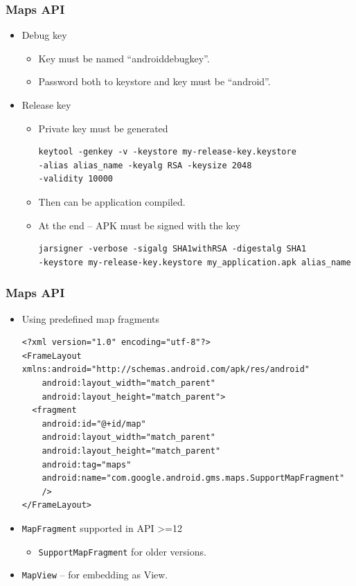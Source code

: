 \documentclass[10pt,xcolor=pdflatex]{beamer}
\begin{document}
\begin{frame}[fragile]\frametitle{Maps API}
\begin{itemize}
	\item Debug key
	  \begin{itemize}
		\item Key must be named “androiddebugkey”.
		\item Password both to keystore and key must be “android”.
	  \end{itemize}
    \item Release key
      \begin{itemize}
    	\item Private key must be generated
         \lstset{language=XML, basicstyle=\footnotesize\ttfamily}
          \begin{lstlisting}
keytool -genkey -v -keystore my-release-key.keystore
-alias alias_name -keyalg RSA -keysize 2048 
-validity 10000
          \end{lstlisting}   
    	\item Then can be application compiled.
        \item At the end -- APK must be signed with the key
         \lstset{language=XML, basicstyle=\footnotesize\ttfamily}
          \begin{lstlisting}
jarsigner -verbose -sigalg SHA1withRSA -digestalg SHA1
-keystore my-release-key.keystore my_application.apk alias_name
\end{lstlisting}   
      \end{itemize}
\end{itemize}
\end{frame}


\begin{frame}[fragile]\frametitle{Maps API}
\begin{itemize}
  \item Using predefined map fragments
\lstset{language=XML, basicstyle=\footnotesize\ttfamily}
\begin{lstlisting}
<?xml version="1.0" encoding="utf-8"?>
<FrameLayout xmlns:android="http://schemas.android.com/apk/res/android"
    android:layout_width="match_parent"
    android:layout_height="match_parent">
  <fragment
    android:id="@+id/map"
    android:layout_width="match_parent"
    android:layout_height="match_parent"
    android:tag="maps"    
    android:name="com.google.android.gms.maps.SupportMapFragment"
    />
</FrameLayout>
\end{lstlisting}  
  \item \texttt{MapFragment} supported in API \textgreater =12
    \begin{itemize}
	  \item \texttt{SupportMapFragment} for older versions.
    \end{itemize}
  \item \texttt{MapView} -- for embedding as View.
\end{itemize}
\end{frame}
\end{document}

